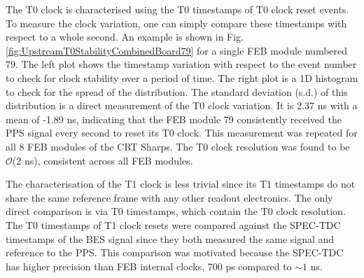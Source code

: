 The T0 clock is characterised using the T0 timestamps of T0 clock reset events.
To measure the clock variation, one can simply compare these timestamps with respect to a whole second.
An example is shown in Fig. \ref{fig:UpstreamT0StabilityCombinedBoard79} for a single FEB module numbered 79.
The left plot shows the timestamp variation with respect to the event number to check for clock stability over a period of time.
The right plot is a 1D histogram to check for the spread of the distribution.
The standard deviation (s.d.) of this distribution is a direct measurement of the T0 clock variation.
It is 2.37 ns with a mean of -1.89 ns, indicating that the FEB module 79 consistently received the PPS signal every second to reset its T0 clock.
This measurement was repeated for all 8 FEB modules of the CRT Sharps.
The T0 clock resolution was found to be $\mathcal{O}$(2 ns), consistent across all FEB modules.

The characterisation of the T1 clock is less trivial since its T1 timestamps do not share the same reference frame with any other readout electronics.
The only direct comparison is via T0 timestamps, which contain the T0 clock resolution. 
The T0 timestamps of T1 clock resets were compared against the SPEC-TDC timestamps of the BES signal since they both measured the same signal and reference to the PPS.
This comparison was motivated because the SPEC-TDC has higher precision than FEB internal clocks, 700 ps compared to $\sim 1$ ns.

